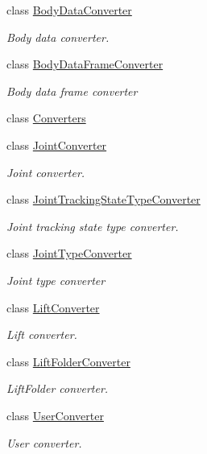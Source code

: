 \begin{DoxyCompactItemize}
\item 
class \mbox{\hyperlink{class_bar_none_1_1_shared_1_1_data_converters_1_1_body_data_converter}{Body\+Data\+Converter}}
\begin{DoxyCompactList}\small\item\em Body data converter. \end{DoxyCompactList}\item 
class \mbox{\hyperlink{class_bar_none_1_1_shared_1_1_data_converters_1_1_body_data_frame_converter}{Body\+Data\+Frame\+Converter}}
\begin{DoxyCompactList}\small\item\em Body data frame converter \end{DoxyCompactList}\item 
class \mbox{\hyperlink{class_bar_none_1_1_shared_1_1_data_converters_1_1_converters}{Converters}}
\item 
class \mbox{\hyperlink{class_bar_none_1_1_shared_1_1_data_converters_1_1_joint_converter}{Joint\+Converter}}
\begin{DoxyCompactList}\small\item\em Joint converter. \end{DoxyCompactList}\item 
class \mbox{\hyperlink{class_bar_none_1_1_shared_1_1_data_converters_1_1_joint_tracking_state_type_converter}{Joint\+Tracking\+State\+Type\+Converter}}
\begin{DoxyCompactList}\small\item\em Joint tracking state type converter. \end{DoxyCompactList}\item 
class \mbox{\hyperlink{class_bar_none_1_1_shared_1_1_data_converters_1_1_joint_type_converter}{Joint\+Type\+Converter}}
\begin{DoxyCompactList}\small\item\em Joint type converter \end{DoxyCompactList}\item 
class \mbox{\hyperlink{class_bar_none_1_1_shared_1_1_data_converters_1_1_lift_converter}{Lift\+Converter}}
\begin{DoxyCompactList}\small\item\em Lift converter. \end{DoxyCompactList}\item 
class \mbox{\hyperlink{class_bar_none_1_1_shared_1_1_data_converters_1_1_lift_folder_converter}{Lift\+Folder\+Converter}}
\begin{DoxyCompactList}\small\item\em Lift\+Folder converter. \end{DoxyCompactList}\item 
class \mbox{\hyperlink{class_bar_none_1_1_shared_1_1_data_converters_1_1_user_converter}{User\+Converter}}
\begin{DoxyCompactList}\small\item\em User converter. \end{DoxyCompactList}\end{DoxyCompactItemize}
